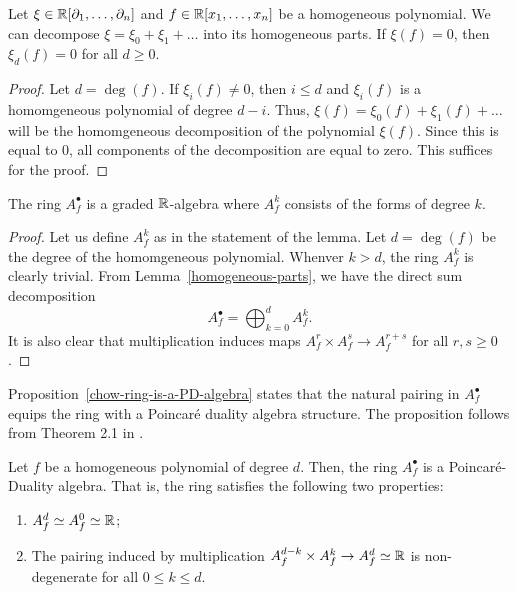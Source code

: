 \documentclass{puthesis-UG}
\begin{document}
\begin{lem} \label{homogeneous-parts}
	Let $\xi \in \mathbb{R}[\partial_1, \ldots, \partial_n]$ and $f \in \mathbb{R}[x_1, \ldots, x_n]$ be a homogeneous polynomial. We can decompose $\xi = \xi_0 + \xi_1 + \ldots$ into its homogeneous parts. If $\xi (f) = 0$, then $\xi_d (f) = 0$ for all $d \geq 0$. 
\end{lem}

\begin{proof}
	Let $d = \deg (f)$. If $\xi_i (f) \neq 0$, then $i \leq d$ and $\xi_i(f)$ is a homomgeneous polynomial of degree $d-i$. Thus, $\xi (f) = \xi_0 (f) + \xi_1(f) + \ldots$ will be the homomgeneous decomposition of the polynomial $\xi(f)$. Since this is equal to $0$, all components of the decomposition are equal to zero. This suffices for the proof. 
\end{proof}

\begin{prop}
	The ring $A_f^\bullet$ is a graded $\mathbb{R}$-algebra where $A_f^k$ consists of the forms of degree $k$. 
\end{prop}

\begin{proof}
	Let us define $A_f^k$ as in the statement of the lemma. Let $d = \deg (f)$ be the degree of the homomgeneous polynomial. Whenver $k > d$, the ring $A_f^k$ is clearly trivial. From Lemma~\ref{homogeneous-parts}, we have the direct sum decomposition 
	\[
		A_f^\bullet = \bigoplus_{k = 0}^d A_f^k.
	\]
	It is also clear that multiplication induces maps $A_f^r \times A_f^s \to A_f^{r+s}$ for all $r, s \geq 0$.
\end{proof}

Proposition~\ref{chow-ring-is-a-PD-algebra} states that the natural pairing in $A_f^\bullet$ equips the ring with a Poincar\'e duality algebra structure. The proposition follows from Theorem 2.1 in \cite{maeno2009lefschetz}. 
\begin{prop} \label{chow-ring-is-a-PD-algebra}
	Let $f$ be a homogeneous polynomial of degree $d$. Then, the ring $A_f^\bullet$ is a Poincar\'e-Duality algebra. That is, the ring satisfies the following two properties:
	\begin{enumerate}[label = (\alph*)]
		\item $A_f^d \simeq A_f^0 \simeq \mathbb{R}$;

		\item The pairing induced by multiplication $A_f^{d-k} \times A_f^k \to A_f^d \simeq \mathbb{R}$ is non-degenerate for all $0 \leq k \leq d$. 
	\end{enumerate}
\end{prop}
\end{document}
